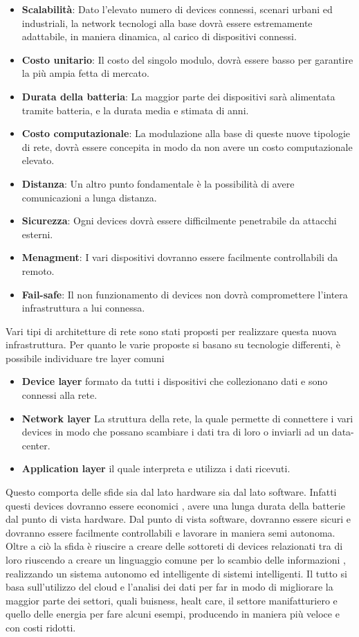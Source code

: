 \begin{itemize}
\item \textbf{Scalabilità}: Dato l'elevato numero di devices connessi, scenari
urbani ed industriali, la network tecnologi alla base dovrà essere estremamente
adattabile, in maniera dinamica, al carico di dispositivi connessi.
\item \textbf{Costo unitario}: Il costo del singolo modulo, dovrà essere basso
per garantire la più ampia fetta di mercato.
\item \textbf{Durata della batteria}: La maggior parte dei dispositivi sarà
alimentata tramite batteria, e la durata media e stimata di anni. 
\item \textbf{Costo computazionale}: La modulazione alla base di queste nuove
tipologie di rete, dovrà essere concepita in modo da non avere un costo
computazionale elevato.
\item \textbf{Distanza}: Un altro punto fondamentale è la possibilità di avere
comunicazioni a lunga distanza.
\item \textbf{Sicurezza}: Ogni devices dovrà essere difficilmente penetrabile da
attacchi esterni.
\item \textbf{Menagment}: I vari dispositivi dovranno essere facilmente
controllabili da remoto.
\item \textbf{Fail-safe}: Il non funzionamento di devices non dovrà
compromettere l'intera infrastruttura a lui connessa. 
\end{itemize}

Vari tipi di architetture di rete sono stati proposti per realizzare questa
nuova infrastruttura. Per quanto le varie proposte si basano su tecnologie
differenti, è possibile individuare tre layer comuni 
\begin{itemize}
\item \textbf{Device layer} formato da tutti i dispositivi che collezionano dati
e sono connessi alla rete.
\item \textbf{Network layer} La struttura della rete, la quale permette di
connettere i vari devices in modo che possano scambiare i dati tra di loro o
inviarli ad un data-center.
\item \textbf{Application layer} il quale interpreta e utilizza i dati ricevuti.
\end{itemize}

Questo comporta delle sfide sia dal lato hardware sia dal lato software. 
Infatti
questi devices dovranno essere economici , avere una lunga durata della batterie
dal punto di vista hardware. Dal punto di vista software, dovranno essere sicuri
e dovranno essere facilmente controllabili e lavorare in maniera semi autonoma.
Oltre a ciò la  sfida è riuscire a creare delle sottoreti di devices relazionati tra di loro
riuscendo a creare un linguaggio comune per lo scambio delle informazioni ,
realizzando un sistema autonomo ed intelligente di sistemi intelligenti. Il
tutto si basa sull'utilizzo del cloud e l'analisi dei dati per far in modo di
migliorare la maggior parte dei settori, quali buisness, healt care, il
settore manifatturiero e quello delle energia per fare alcuni esempi, producendo
in maniera più veloce e con costi ridotti. 

